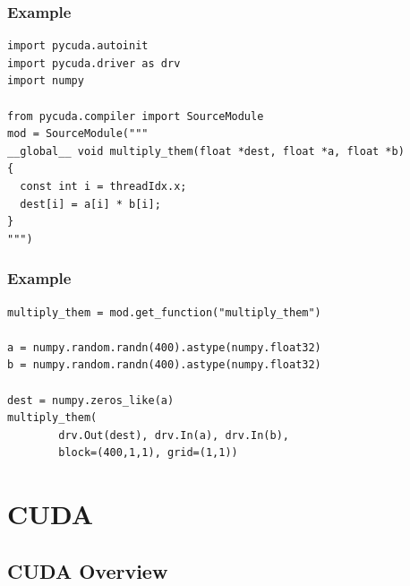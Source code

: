 \documentclass[a4paper,9pt]{beamer}
\begin{document}
\begin{frame}[fragile]
\frametitle{Example}
\begin{Verbatim}
import pycuda.autoinit
import pycuda.driver as drv
import numpy

from pycuda.compiler import SourceModule
mod = SourceModule("""
__global__ void multiply_them(float *dest, float *a, float *b)
{
  const int i = threadIdx.x;
  dest[i] = a[i] * b[i];
}
""")

\end{Verbatim}
\end{frame}

\begin{frame}[fragile]
\frametitle{Example}
\begin{Verbatim}
multiply_them = mod.get_function("multiply_them")

a = numpy.random.randn(400).astype(numpy.float32)
b = numpy.random.randn(400).astype(numpy.float32)

dest = numpy.zeros_like(a)
multiply_them(
        drv.Out(dest), drv.In(a), drv.In(b),
        block=(400,1,1), grid=(1,1))
\end{Verbatim}
\end{frame}


\section{CUDA}
\subsection{CUDA Overview}
\end{document}
